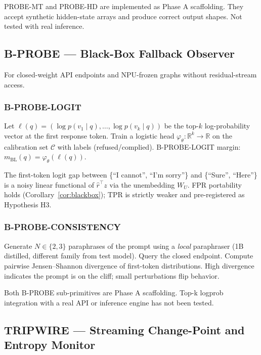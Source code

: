 \documentclass[11pt,a4paper]{article}
\newcommand{\rhat}{\hat{r}}
\begin{document}
\begin{scaffoldbox}
PROBE-MT and PROBE-HD are implemented as Phase A scaffolding. They accept synthetic
hidden-state arrays and produce correct output shapes. Not tested with real inference.
\end{scaffoldbox}

\subsection{B-PROBE — Black-Box Fallback Observer}

For closed-weight API endpoints and NPU-frozen graphs without residual-stream access.

\subsubsection*{B-PROBE-LOGIT}

Let $\ell(q) = (\log p(v_1 \mid q), \ldots, \log p(v_k \mid q))$ be the top-$k$
log-probability vector at the first response token.
Train a logistic head $\varphi_\theta : \mathbb{R}^k \to \mathbb{R}$ on the
calibration set $\mathcal{C}$ with labels (refused/complied).
B-PROBE-LOGIT margin: $m_\text{BL}(q) = \varphi_\theta(\ell(q))$.

The first-token logit gap between \{``I cannot'', ``I'm sorry''\} and
\{``Sure'', ``Here''\} is a noisy linear functional of $\rhat^\top z$ via the
unembedding $W_U$.
FPR portability holds (Corollary~\ref{cor:blackbox}); TPR is strictly weaker and
pre-registered as Hypothesis H3.

\subsubsection*{B-PROBE-CONSISTENCY}

Generate $N \in \{2, 3\}$ paraphrases of the prompt using a \emph{local}
paraphraser (1B distilled, different family from test model).
Query the closed endpoint.
Compute pairwise Jensen--Shannon divergence of first-token distributions.
High divergence indicates the prompt is on the cliff; small perturbations flip behavior.

\begin{scaffoldbox}
Both B-PROBE sub-primitives are Phase A scaffolding. Top-k logprob integration with
a real API or inference engine has not been tested.
\end{scaffoldbox}

\subsection{TRIPWIRE — Streaming Change-Point and Entropy Monitor}
\end{document}
